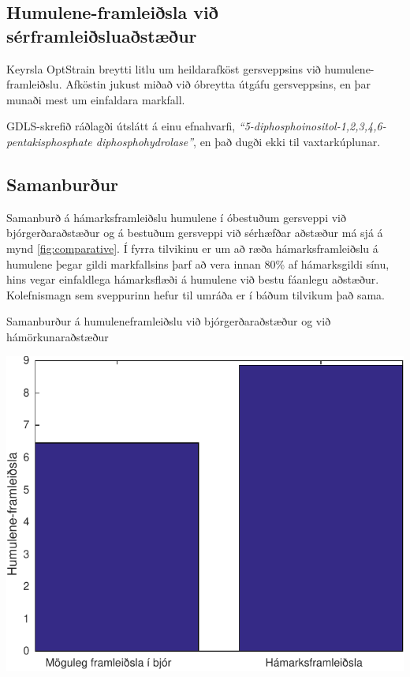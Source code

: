 \documentclass[11pt]{article}
\makeatletter
\newenvironment{figureonecolumn}{\begin{minipage}{\linewidth}\begin{center}\def\@captype{figure}}{\end{center}\end{minipage}}
\makeatother
\begin{document}
\begin{multicols}{2}
\subsection{Humulene-framleiðsla við sérframleiðsluaðstæður}
Keyrsla OptStrain breytti litlu um heildarafköst gersveppsins við humulene-framleiðslu. Afköstin jukust miðað við óbreytta útgáfu gersveppsins, en þar munaði mest um einfaldara markfall.

GDLS-skrefið ráðlagði útslátt á einu efnahvarfi, \emph{``5-diphosphoinositol-1,2,3,4,6-pentakisphosphate diphosphohydrolase''}, en það dugði ekki til vaxtarkúplunar.
\subsection{Samanburður}
Samanburð á hámarksframleiðslu humulene í óbestuðum gersveppi við bjórgerðaraðstæður og á bestuðum gersveppi við sérhæfðar aðstæður má sjá á mynd \ref{fig:comparative}. Í fyrra tilvikinu er um að ræða hámarksframleiðslu á humulene þegar gildi markfallsins þarf að vera innan 80\% af hámarksgildi sínu, hins vegar einfaldlega hámarksflæði á humulene við bestu fáanlegu aðstæður. Kolefnismagn sem sveppurinn hefur til umráða er í báðum tilvikum það sama.

\begin{figureonecolumn}
\caption{Samanburður á humuleneframleiðslu við bjórgerðaraðstæður og við hámörkunaraðstæður}
\label{fig:comparative}
\includegraphics[width=\linewidth]{Pics/ComparativeProduction}
\end{figureonecolumn}


\end{multicols}
\end{document}

